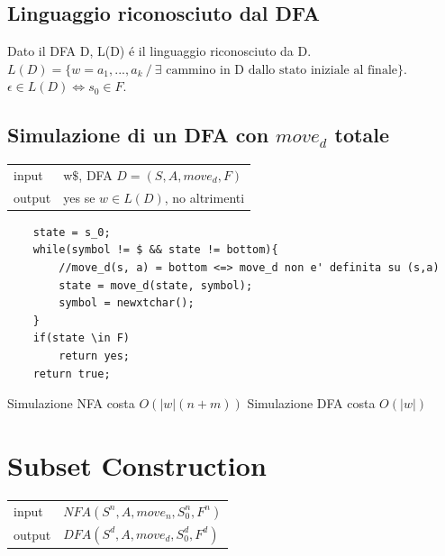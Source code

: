 \subsection{Linguaggio riconosciuto dal DFA}
Dato il DFA D, L(D) \'e il linguaggio riconosciuto da D. \\
$L(D) = \{ w=a_1,...,a_k \ / \ \exists \text{ cammino in D dallo stato iniziale al finale}\}$.
$\epsilon \in L(D) \iff s_0 \in F$.

\subsection{Simulazione di un DFA con $move_d$ totale}
\begin{center}
    \begin{tabular}{ll}
        input & w$\$$, DFA $D=(S,A,move_d,F)$\\
        output & yes se $w \in L(D)$, no altrimenti\\
    \end{tabular}
\end{center}

\begin{lstlisting}
    state = s_0;
    while(symbol != $ && state != bottom){
        //move_d(s, a) = bottom <=> move_d non e' definita su (s,a)
        state = move_d(state, symbol);
        symbol = newxtchar();
    }
    if(state \in F)
        return yes;
    return true;
\end{lstlisting}

Simulazione NFA costa $O(|w|(n+m))$
Simulazione DFA costa $O(|w|)$

\section{Subset Construction}
\begin{center}
    \begin{tabular}{ll}
        input & $NFA(S^n,A,move_n, S_0 ^n,F^n)$\\ 
        output & $DFA(S^d,A,move_d, S_0 ^d,F^d)$\\
    \end{tabular}
\end{center}

\begin{lstlisting}
    
\end{lstlisting}